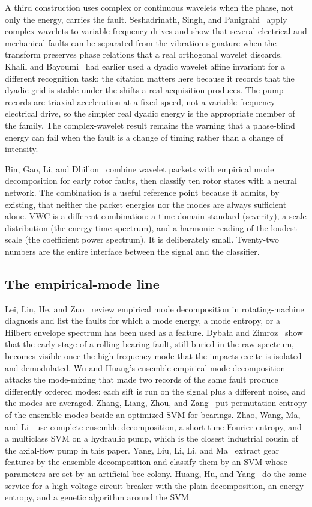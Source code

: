 A third construction uses complex or continuous wavelets when the phase, not only the energy, carries the fault.
Seshadrinath, Singh, and Panigrahi~\cite{seshadrinath2014} apply complex wavelets to variable-frequency drives and show that several electrical and mechanical faults can be separated from the vibration signature when the transform preserves phase relations that a real orthogonal wavelet discards.
Khalil and Bayoumi~\cite{khalil2001} had earlier used a dyadic wavelet affine invariant for a different recognition task; the citation matters here because it records that the dyadic grid is stable under the shifts a real acquisition produces.
The pump records are triaxial acceleration at a fixed speed, not a variable-frequency electrical drive, so the simpler real dyadic energy is the appropriate member of the family.
The complex-wavelet result remains the warning that a phase-blind energy can fail when the fault is a change of timing rather than a change of intensity.

Bin, Gao, Li, and Dhillon~\cite{bin2012} combine wavelet packets with empirical mode decomposition for early rotor faults, then classify ten rotor states with a neural network.
The combination is a useful reference point because it admits, by existing, that neither the packet energies nor the modes are always sufficient alone.
VWC is a different combination: a time-domain standard (severity), a scale distribution (the energy time-spectrum), and a harmonic reading of the loudest scale (the coefficient power spectrum).
It is deliberately small.
Twenty-two numbers are the entire interface between the signal and the classifier.

\subsection{The empirical-mode line}

Lei, Lin, He, and Zuo~\cite{lei2013} review empirical mode decomposition in rotating-machine diagnosis and list the faults for which a mode energy, a mode entropy, or a Hilbert envelope spectrum has been used as a feature.
Dybała and Zimroz~\cite{dybala2014} show that the early stage of a rolling-bearing fault, still buried in the raw spectrum, becomes visible once the high-frequency mode that the impacts excite is isolated and demodulated.
Wu and Huang's ensemble empirical mode decomposition~\cite{wu2009} attacks the mode-mixing that made two records of the same fault produce differently ordered modes: each sift is run on the signal plus a different noise, and the modes are averaged.
Zhang, Liang, Zhou, and Zang~\cite{zhang2015} put permutation entropy of the ensemble modes beside an optimized SVM for bearings.
Zhao, Wang, Ma, and Li~\cite{zhao2016} use complete ensemble decomposition, a short-time Fourier entropy, and a multiclass SVM on a hydraulic pump, which is the closest industrial cousin of the axial-flow pump in this paper.
Yang, Liu, Li, Li, and Ma~\cite{yang2015,karaboga2007} extract gear features by the ensemble decomposition and classify them by an SVM whose parameters are set by an artificial bee colony.
Huang, Hu, and Yang~\cite{huang2011} do the same service for a high-voltage circuit breaker with the plain decomposition, an energy entropy, and a genetic algorithm around the SVM.

